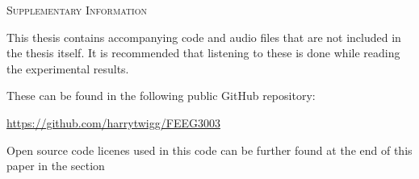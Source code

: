 \begin{center}
    \textsc{Supplementary Information}
\end{center}

This thesis contains accompanying code and audio files that are not included in the thesis itself. It is recommended that listening to these is done while reading the experimental results.

These can be found in the following public GitHub repository:

\href{https://github.com/harrytwigg/FEEG3003}{https://github.com/harrytwigg/FEEG3003}

Open source code licenes used in this code can be further found at the end of this paper in the section 